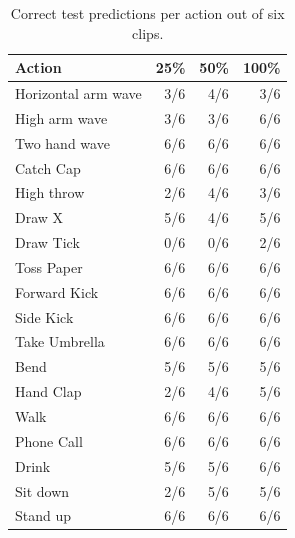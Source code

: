 \begin{table}[t]
\centering
\caption{Correct test predictions per action out of six clips.}
\label{tab:kard-action-recall}
\small
\begin{tabular}{lrrr}
\toprule
Action & 25\% & 50\% & 100\% \\
\midrule
Horizontal arm wave & 3/6 & 4/6 & 3/6 \\
High arm wave & 3/6 & 3/6 & 6/6 \\
Two hand wave & 6/6 & 6/6 & 6/6 \\
Catch Cap & 6/6 & 6/6 & 6/6 \\
High throw & 2/6 & 4/6 & 3/6 \\
Draw X & 5/6 & 4/6 & 5/6 \\
Draw Tick & 0/6 & 0/6 & 2/6 \\
Toss Paper & 6/6 & 6/6 & 6/6 \\
Forward Kick & 6/6 & 6/6 & 6/6 \\
Side Kick & 6/6 & 6/6 & 6/6 \\
Take Umbrella & 6/6 & 6/6 & 6/6 \\
Bend & 5/6 & 5/6 & 5/6 \\
Hand Clap & 2/6 & 4/6 & 5/6 \\
Walk & 6/6 & 6/6 & 6/6 \\
Phone Call & 6/6 & 6/6 & 6/6 \\
Drink & 5/6 & 5/6 & 6/6 \\
Sit down & 2/6 & 5/6 & 5/6 \\
Stand up & 6/6 & 6/6 & 6/6 \\
\bottomrule
\end{tabular}
\end{table}
